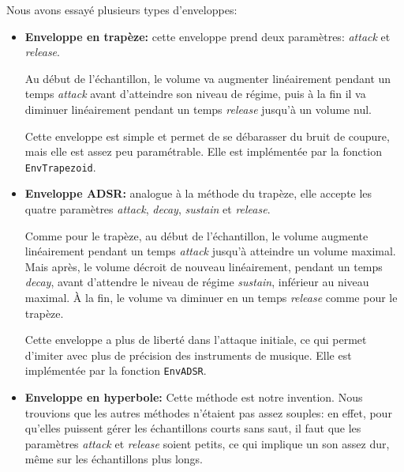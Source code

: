 \documentclass[a4paper,12pt]{article}
\begin{document}
Nous avons essayé plusieurs types d'enveloppes:
\begin{itemize}
    \item \textbf{Enveloppe en trapèze:} cette enveloppe prend deux paramètres:
        \emph{attack} et \emph{release}.
        
        Au début de l'échantillon, le volume va augmenter linéairement
        pendant un temps \emph{attack} avant d'atteindre son niveau de régime,
        puis à la fin il va diminuer linéairement pendant un temps
        \emph{release} jusqu'à un volume nul.
        
        Cette enveloppe est simple et permet de se débarasser du bruit de
        coupure, mais elle est assez peu paramétrable.
        Elle est implémentée par la fonction \texttt{EnvTrapezoid}.
    
    \item \textbf{Enveloppe ADSR:} analogue à la méthode du trapèze,
        elle accepte les quatre paramètres \emph{attack}, \emph{decay},
        \emph{sustain} et \emph{release}.
        
        Comme pour le trapèze, au début de l'échantillon, le volume augmente
        linéairement pendant un temps \emph{attack} jusqu'à atteindre un volume
        maximal. Mais après, le volume décroit de nouveau linéairement,
        pendant un temps \emph{decay}, avant d'attendre le niveau de régime
        \emph{sustain}, inférieur au niveau maximal.
        À la fin, le volume va diminuer en un temps \emph{release} comme pour
        le trapèze.
        
        Cette enveloppe a plus de liberté dans l'attaque initiale, ce qui
        permet d'imiter avec plus de précision des instruments de musique.
        Elle est implémentée par la fonction \texttt{EnvADSR}.
    
    \item \textbf{Enveloppe en hyperbole:}
        Cette méthode est notre invention.
        Nous trouvions que les autres méthodes n'étaient pas assez souples:
        en effet, pour qu'elles puissent gérer
        les échantillons courts sans saut,
        il faut que les paramètres \emph{attack} et \emph{release}
        soient petits, ce qui implique un son assez dur,
        même sur les échantillons plus longs.
        

\end{itemize}
\end{document}

